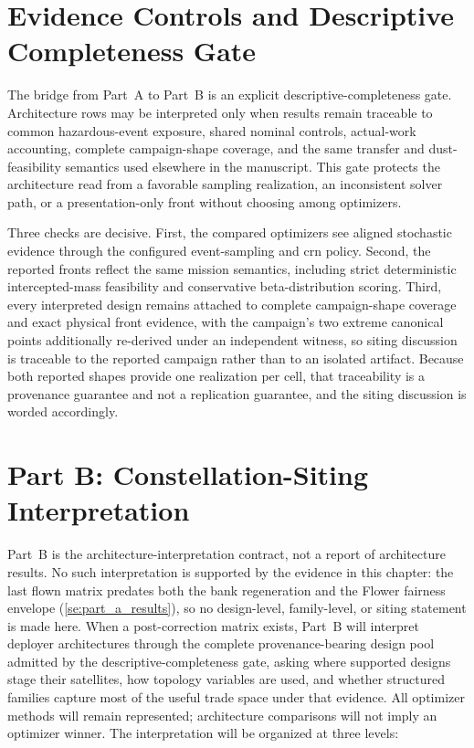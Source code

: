 \section{Evidence Controls and Descriptive Completeness Gate} \label{se:best_optimizer_gate}

The bridge from Part~A to Part~B is an explicit descriptive-completeness gate. Architecture rows may be interpreted only when results remain traceable to common hazardous-event exposure, shared nominal controls, actual-work accounting, complete campaign-shape coverage, and the same transfer and dust-feasibility semantics used elsewhere in the manuscript. This gate protects the architecture read from a favorable sampling realization, an inconsistent solver path, or a presentation-only front without choosing among optimizers.

Three checks are decisive. First, the compared optimizers see aligned stochastic evidence through the configured event-sampling and \gls{crn} policy. Second, the reported fronts reflect the same mission semantics, including strict deterministic intercepted-mass feasibility and conservative beta-distribution scoring. Third, every interpreted design remains attached to complete campaign-shape coverage and exact physical front evidence, with the campaign's two extreme canonical points additionally re-derived under an independent witness, so siting discussion is traceable to the reported campaign rather than to an isolated artifact. Because both reported shapes provide one realization per cell, that traceability is a provenance guarantee and not a replication guarantee, and the siting discussion is worded accordingly.

\section{Part B: Constellation-Siting Interpretation} \label{se:part_b_results}

Part~B is the architecture-interpretation contract, not a report of architecture results. No such interpretation is supported by the evidence in this chapter: the last flown matrix predates both the bank regeneration and the Flower fairness envelope (\cref{se:part_a_results}), so no design-level, family-level, or siting statement is made here. When a post-correction matrix exists, Part~B will interpret deployer architectures through the complete provenance-bearing design pool admitted by the descriptive-completeness gate, asking where supported designs stage their satellites, how topology variables are used, and whether structured families capture most of the useful trade space under that evidence. All optimizer methods will remain represented; architecture comparisons will not imply an optimizer winner. The interpretation will be organized at three levels:

